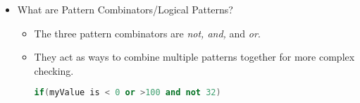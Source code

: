 \documentclass{article}
\begin{document}
\begin{itemize}
\begin{itemize}
                \begin{lstlisting}[language=C++]
                if(myPair is (false, false))
                if(myCoords is (0.5f, _, 0.5f))\end{lstlisting}
        \item Var Pattern: The var pattern always succeeds, as it doesn't check for anything, but instead stores an expression into a var.
        \begin{lstlisting}[language=C++]
                if(getData() is var myData && myData.value is 32) \end{lstlisting} 
    \end{itemize}

    \item What are Pattern Combinators/Logical Patterns?
    \begin{itemize}
        \item The three pattern combinators are \textit{not, and,} and \textit{or}.
        \item They act as ways to combine multiple patterns together for more complex checking.
        \begin{lstlisting}[language=C++]
                if(myValue is < 0 or >100 and not 32) \end{lstlisting} 
    \end{itemize}
\end{itemize}
\end{document}
